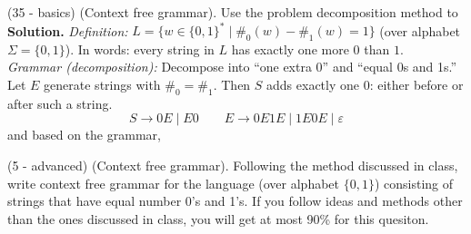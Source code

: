 \documentclass[12pt, letterpaper]{article}
\begin{document}
{ \item (35 - basics) (Context free grammar). Use the problem decomposition method to 
	\textbf{Solution.} \emph{Definition:} $L = \{ w \in \{0,1\}^* \mid \#_0(w) - \#_1(w) = 1 \}$ (over alphabet $\Sigma = \{0,1\}$). In words: every string in $L$ has exactly one more $0$ than $1$. \\
	\emph{Grammar (decomposition):} Decompose into ``one extra 0'' and ``equal 0s and 1s.'' Let $E$ generate strings with $\#_0 = \#_1$. Then $S$ adds exactly one $0$: either before or after such a string. 
	\[
	S \to 0E \mid E0 \qquad
	E \to 0E1E \mid 1E0E \mid \varepsilon
	\]
	and based on the grammar,
   
	\item (5 - advanced) (Context free grammar). Following the method discussed in class, write context free grammar for the language (over alphabet $\{0, 1\}$) consisting of strings that have equal number 0's and 1's. If you follow ideas and methods other than the ones discussed in class, you will get at most 90\% for this quesiton. 

}
\end{document}
